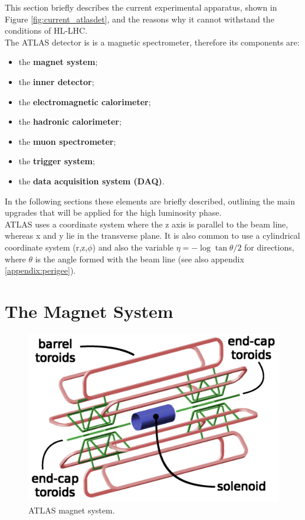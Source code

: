 \documentclass[a4paper,twoside,12pt]{book}
\begin{document}
This section briefly describes the current experimental apparatus, shown in Figure \ref{fig:current_atlasdet}, and the reasons why it cannot withstand the conditions of HL-LHC. \\

The ATLAS detector is is a magnetic spectrometer, therefore its components are:
\begin{itemize}
\item the \textbf{magnet system};
\item the \textbf{inner detector};
\item the \textbf{electromagnetic calorimeter};
\item the \textbf{hadronic calorimeter};
\item the \textbf{muon spectrometer};
\item the \textbf{trigger system};
\item the \textbf{data acquisition system (DAQ)}.
\end{itemize}

In the following sections these elements are briefly described, outlining the main upgrades that will be applied for the high luminosity phase. \\

ATLAS uses a coordinate system where the z axis is parallel to the beam line, whereas x and y lie in the transverse plane. It is also common to use
a cylindrical coordinate system (r,z,$\phi$) and also the variable $\eta = -\log{\tan{\theta/2}}$ for directions, where $\theta$ is the angle formed with 
the beam line (see also appendix \ref{appendix:perigee}).

\section{The Magnet System}\label{sec:magnet}

\begin{figure} [h]
	\centering
	\includegraphics[scale=0.13]{magnetSystems}
	\caption{ATLAS magnet system\cite{magnet_system_picture}.}
	\label{fig:magnet_system_picture}
\end{figure}
\end{document}
